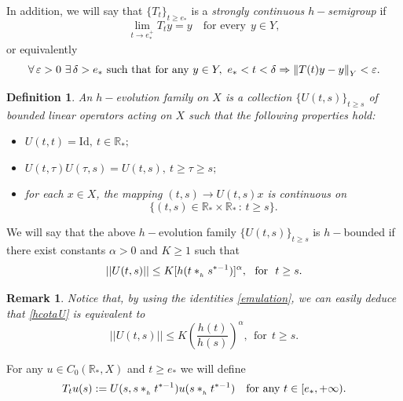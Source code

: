 \documentclass[10pt]{amsart}
\newtheorem{definition}{Definition}
\newtheorem{remark}{Remark}
\numberwithin{equation}{section}
\begin{document}
In addition, we will say that  $\{T_t\}_{t \ge e_*}$  is a \textit{strongly continuous $h-$semigroup} if
$$
\lim_{t\to e_*^+} T_t y = y \quad \mbox{for every} \ \ y \in Y,
$$
or equivalently
\begin{displaymath}
\forall \, \varepsilon > 0 \,\, \exists \, \delta > e_* \ \textnormal{such that for any} \ y \in Y, \ 
e_* < t < \delta \Rightarrow \left\|T(t) y - y \right\|_{Y}<\varepsilon.
\end{displaymath}



\begin{definition}
    
 An $h-$evolution family on $X$ is a collection $\{U(t,s)\}_{t\ge s}$ of bounded linear operators acting on $X$  such that the following properties hold:

\begin{itemize}
    \item $U(t,t) = \mathrm{Id}, \ t \in \mathbb{R}_*;$
    \item $U(t,\tau) U(\tau, s)= U(t,s), \ t \ge \tau \ge s;$
    \item for each $x \in X$, the mapping $(t,s) \to U(t,s)x$ is continuous on 
    $$\{(t,s) \in \mathbb{R}_* \times \mathbb{R}_{*} \, : \, t \ge s\}.$$
    \end{itemize}
\end{definition}


We will say that the above $h-$evolution family $\{U(t,s)\}_{t\ge s}$ is $h-$bounded if there exist constants $\alpha > 0$ and $K \ge 1$ such that 
\begin{equation}{\label{hcotaU}}
    ||U(t,s)|| \le K [h(t*_{_h}s^{*-1})]^\alpha, \ \ \mbox{for} \ \ t \ge s.
\end{equation}

\begin{remark}
Notice that, by using the identities \eqref{emulation}, we can easily deduce that \eqref{hcotaU}
is equivalent to 
\begin{displaymath}
||U(t,s)|| \le K \left(\frac{h(t)}{h(s)}\right)^\alpha, \ \ \mbox{for} \ \ t \ge s.
\end{displaymath}
\end{remark}


For any
 $u \in C_0(\mathbb{R}_*, X)$ and $t \ge e_*$ we will define 
\begin{equation}\label{SemigPaper}
T_tu(s) := U(s, s*_{_h}t^{*-1}) u(s*_{_h}t^{*-1}) \quad \textnormal{for any $t\in [e_{*},+\infty)$}.
\end{equation}
\end{document}
